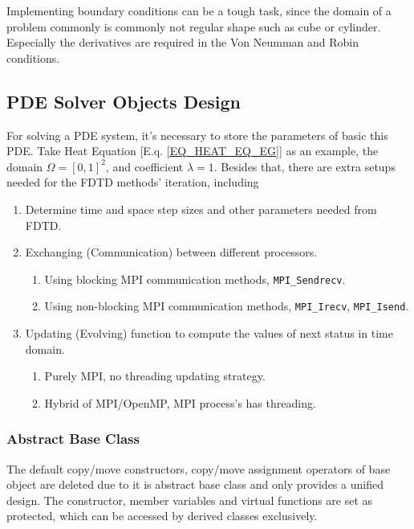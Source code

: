 Implementing boundary conditions can be a tough task, since the domain of a problem commonly is commonly not regular shape such as cube or cylinder.
Especially the derivatives are required in the Von Neumman and Robin conditions.





\subsection{PDE Solver Objects Design}
For solving a PDE system, it's necessary to store the parameters of basic this PDE.
Take Heat Equation [E.q. \ref{EQ_HEAT_EQ_EG}] as an example, the domain $\Omega = \left[0,1\right]^2$, and coefficient $\lambda = 1$.
Besides that, there are extra setups needed for the FDTD methods' iteration, including 
\begin{enumerate}
  \item Determine time and space step sizes and other parameters needed from FDTD.
  \item Exchanging (Communication) between different processors.
  \begin{enumerate}
    \item Using blocking MPI communication methods, \texttt{MPI\_Sendrecv}.
    \item Using non-blocking MPI communication methods, \texttt{MPI\_Irecv}, \texttt{MPI\_Isend}.
  \end{enumerate}
  \item Updating (Evolving) function to compute the values of next status in time domain.
  \begin{enumerate}
    \item Purely MPI, no threading updating strategy.
    \item Hybrid of MPI/OpenMP, MPI process's has threading.
  \end{enumerate}
\end{enumerate}

\subsubsection{Abstract Base Class}
The default copy/move constructors, copy/move assignment operators of base object are deleted 
due to it is abstract base class and only provides a unified design.
The constructor, member variables and virtual functions are set as protected, which can be accessed by derived classes exclusively.
